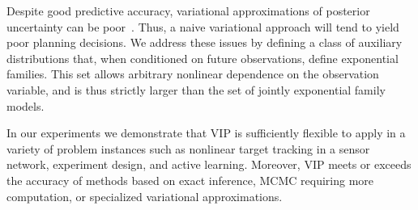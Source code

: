 
Despite good predictive accuracy, variational approximations of
posterior uncertainty can be poor~\citep{giordano2015linear,
turner2011two}.  Thus, a naive variational approach will tend to yield
poor planning decisions.  We address these issues by defining a class
of auxiliary distributions that, when conditioned on future
observations, define exponential families.  This set allows arbitrary
nonlinear dependence on the observation variable, and is thus strictly
larger than the set of jointly exponential family models.

In our experiments we demonstrate that VIP is sufficiently flexible to
apply in a variety of problem instances such as nonlinear target
tracking in a sensor network, experiment design, and active learning.
Moreover, VIP meets or exceeds the accuracy of methods based on exact
inference, MCMC requiring more computation, or specialized variational
approximations. 



